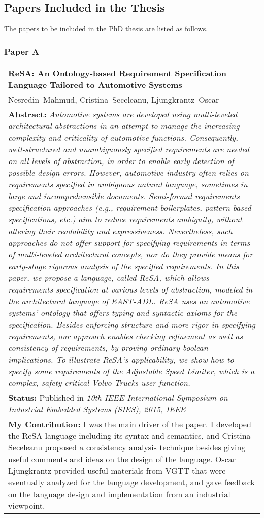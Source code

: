 \subsection{Papers Included in the Thesis}\label{papersincl}
The papers to be included in the PhD thesis are listed as follows.

\subsubsection{Paper A}
\begin{tabular}{p{\textwidth}}
\textbf{ReSA: An Ontology-based Requirement Specification Language Tailored to Automotive Systems} \\
Nesredin~Mahmud, Cristina~Seceleanu, Ljungkrantz~Oscar\\[6pt]
\textbf{Abstract:} \textit{Automotive systems are developed using multi-leveled architectural abstractions in an attempt to manage the increasing complexity and criticality of automotive functions. Consequently, well-structured and unambiguously specified requirements are needed on all levels of abstraction, in order to enable early detection of possible design errors. However, automotive industry often relies on requirements specified in ambiguous natural language, sometimes in large and incomprehensible documents. Semi-formal requirements specification approaches (e.g., requirement boilerplates, pattern-based specifications, etc.) aim to reduce requirements ambiguity, without altering their readability and expressiveness. Nevertheless, such approaches do not offer support for specifying requirements in terms of multi-leveled architectural concepts, nor do they provide means for early-stage rigorous analysis of the specified requirements. In this paper, we propose a language, called ReSA, which allows requirements specification at various levels of abstraction, modeled in the architectural language of EAST-ADL. ReSA uses an automotive systems' ontology that offers typing and syntactic axioms for the specification. Besides enforcing structure and more rigor in specifying requirements, our approach enables checking refinement as well as consistency of requirements, by proving ordinary boolean implications. To illustrate ReSA's applicability, we show how to specify some requirements of the Adjustable Speed Limiter, which is a complex, safety-critical Volvo Trucks user function.}\\[6pt]
\textbf{Status:} Published in \textit{10th IEEE International Symposium on Industrial Embedded Systems (SIES), 2015, IEEE}\\
\textbf{My Contribution: }I was the main driver of the paper. I developed the ReSA language including its syntax and semantics, and Cristina Seceleanu proposed a consistency analysis technique besides giving useful comments and ideas on the design of the language. Oscar Ljungkrantz provided useful materials from VGTT that were eventually analyzed for the language development, and gave feedback on the language design and implementation from an industrial viewpoint.
\end{tabular}


